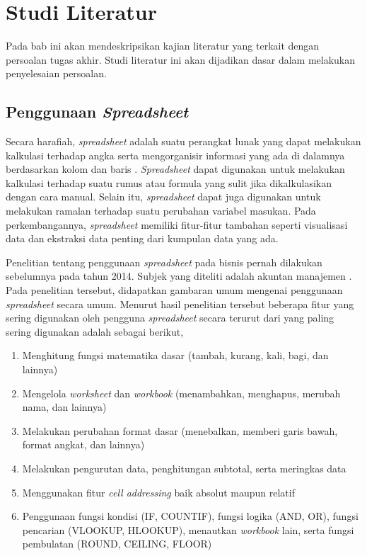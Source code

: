 \chapter{Studi Literatur}

Pada bab ini akan mendeskripsikan kajian literatur yang terkait dengan persoalan tugas akhir. Studi literatur ini akan dijadikan dasar dalam melakukan penyelesaian persoalan.

\section{Penggunaan \textit{Spreadsheet}}
Secara harafiah, \textit{spreadsheet} adalah suatu perangkat lunak yang dapat melakukan kalkulasi terhadap angka serta mengorganisir informasi yang ada di dalamnya berdasarkan kolom dan baris \parencite{meriamwebster-spreadsheet}. \textit{Spreadsheet} dapat digunakan untuk melakukan kalkulasi terhadap suatu rumus atau formula yang sulit jika dikalkulasikan dengan cara manual. Selain itu, \textit{spreadsheet} dapat juga digunakan untuk melakukan ramalan terhadap suatu perubahan variabel masukan. Pada perkembangannya, \textit{spreadsheet} memiliki fitur-fitur tambahan seperti visualisasi data dan ekstraksi data penting dari kumpulan data yang ada.

Penelitian tentang penggunaan \textit{spreadsheet} pada bisnis pernah dilakukan sebelumnya pada tahun 2014. Subjek yang diteliti adalah akuntan manajemen \parencite{Bradbard2014}. Pada penelitian tersebut, didapatkan gambaran umum mengenai penggunaan \textit{spreadsheet} secara umum. Menurut hasil penelitian tersebut beberapa fitur yang sering digunakan oleh pengguna \textit{spreadsheet} secara terurut dari yang paling sering digunakan adalah sebagai berikut,

\begin{enumerate}
    \item Menghitung fungsi matematika dasar (tambah, kurang, kali, bagi, dan lainnya)
    \item Mengelola \textit{worksheet} dan \textit{workbook} (menambahkan, menghapus, merubah nama, dan lainnya)
    \item Melakukan perubahan format dasar (menebalkan, memberi garis bawah, format angkat, dan lainnya)
    \item Melakukan pengurutan data, penghitungan subtotal, serta meringkas data
    \item Menggunakan fitur \textit{cell addressing} baik absolut maupun relatif
    \item Penggunaan fungsi kondisi (IF, COUNTIF), fungsi logika (AND, OR), fungsi pencarian (VLOOKUP, HLOOKUP), menautkan \textit{workbook} lain, serta fungsi pembulatan (ROUND, CEILING, FLOOR)
\end{enumerate}

